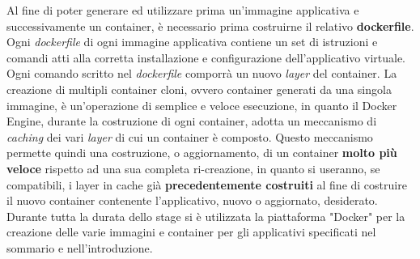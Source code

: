 Al fine di poter generare ed utilizzare prima un'immagine applicativa e successivamente un container, è necessario prima costruirne il relativo \textbf{\gls{dockerfile}}.
Ogni \textit{dockerfile} di ogni immagine applicativa contiene un set di istruzioni e comandi atti alla corretta installazione e configurazione dell'applicativo virtuale. Ogni comando scritto nel \textit{dockerfile} comporrà un nuovo \textit{layer} del container.
La creazione di multipli container cloni, ovvero container generati da una singola immagine, è un'operazione di semplice e veloce esecuzione, in quanto il Docker Engine, durante la costruzione di ogni container, adotta un meccanismo di \textit{\gls{caching}} dei vari \textit{\gls{layer}} di cui un container è composto. Questo meccanismo permette quindi una costruzione, o aggiornamento, di un container \textbf{molto più veloce} rispetto ad una sua completa ri-creazione, in quanto si useranno, se compatibili, i layer in cache già \textbf{precedentemente costruiti} al fine di costruire il nuovo container contenente l'applicativo, nuovo o aggiornato, desiderato.\\
Durante tutta la durata dello stage si è utilizzata la piattaforma "Docker" per la creazione delle varie immagini e container per gli applicativi specificati nel sommario e nell'introduzione.

